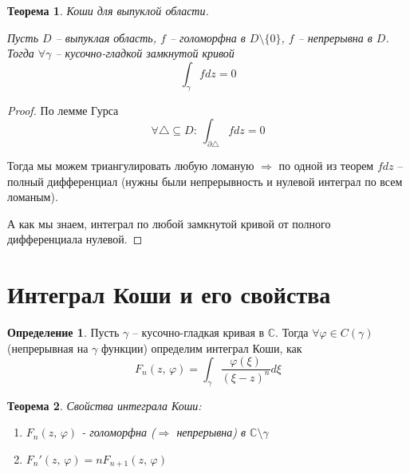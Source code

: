 \documentclass[a4paper,12pt]{article}
\renewcommand{\phi}{\ensuremath{\varphi}}
\theoremstyle{plain}
\newtheorem{theorem}{Теорема}[section]
\theoremstyle{definition}
\newtheorem{definition}{Определение}[section]
\theoremstyle{remark}
\begin{document}
\begin{theorem}
	Коши для выпуклой области.

	Пусть $D$ -- выпуклая область, $f$ -- голоморфна в $D \setminus \{0\}$, $f$ -- непрерывна в $D$. Тогда $\forall \gamma$ -- кусочно-гладкой замкнутой кривой
	\[
		\int_\gamma fdz = 0
	\]
\end{theorem}

\begin{proof}
	По лемме Гурса
	\[
		\forall \triangle \subseteq D :\: \int_{\partial \triangle} fdz = 0
	\]

	Тогда мы можем триангулировать любую ломаную $\Rightarrow$ по одной из теорем $fdz$ -- полный дифференциал (нужны были непрерывность и нулевой интеграл по всем ломаным).

	А как мы знаем, интеграл по любой замкнутой кривой от полного дифференциала нулевой.
\end{proof}

\section{Интеграл Коши и его свойства}
\begin{definition}
	Пусть $\gamma$ -- кусочно-гладкая кривая в $\mathbb{C}$. Тогда $\forall \phi \in C(\gamma)$ (непрерывная на $\gamma$ функции) определим интеграл Коши, как
	\[
		F_n(z,\, \phi) = \int_\gamma \frac{\phi(\xi)}{(\xi - z)^n}d\xi
	\]
\end{definition}

\begin{theorem}
	Свойства интеграла Коши:
	\begin{enumerate}
		\item $F_n(z,\, \phi)$ - голоморфна ($\Rightarrow$ непрерывна) в $\mathbb{C} \setminus \gamma$
		\item $F_n'(z,\, \phi) = nF_{n + 1}(z,\, \phi)$
	\end{enumerate}
\end{theorem}
\end{document}
